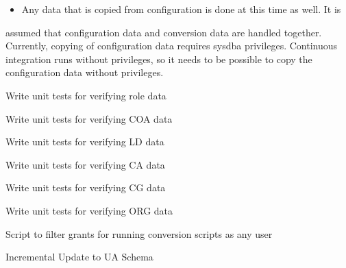 \begin{itemize}
\item Any data that is copied from configuration is done at this time as well. It is
\end{itemize}

assumed that configuration data and conversion data are handled together. Currently,
copying of configuration data requires sysdba privileges. Continuous integration
runs without privileges, so it needs to be possible to copy the configuration
                       data without privileges.
\begin{description}

\item[Write unit tests for verifying role data]\label{sec-1.2.2.1}


\end{description}
\begin{description}

\item[Write unit tests for verifying COA data]\label{sec-1.2.2.2}


\end{description}
\begin{description}

\item[Write unit tests for verifying LD data]\label{sec-1.2.2.3}


\end{description}
\begin{description}

\item[Write unit tests for verifying CA data]\label{sec-1.2.2.4}


\end{description}
\begin{description}

\item[Write unit tests for verifying CG data]\label{sec-1.2.2.5}


\end{description}
\begin{description}

\item[Write unit tests for verifying ORG data]\label{sec-1.2.2.6}


\end{description}
\begin{description}

\item[Script to filter grants for running conversion scripts as any user]\label{sec-1.2.2.7}


\end{description}
\begin{description}

\item[Incremental Update to UA Schema]\label{sec-1.2.2.8}


\end{description}
